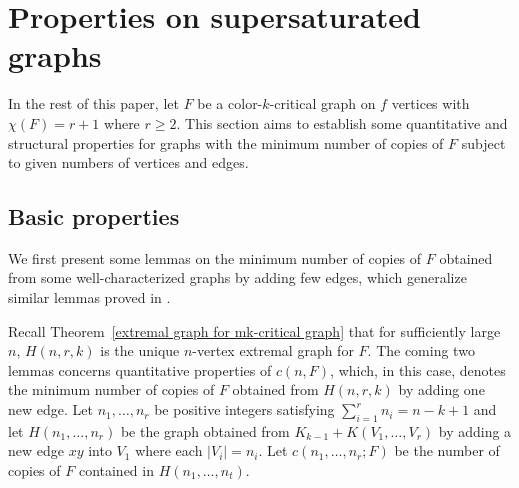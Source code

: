 \documentclass[10pt]{article}
\begin{document}
\section{Properties on supersaturated graphs}\label{sec_properties-of-H}
In the rest of this paper, let $F$ be a color-$k$-critical graph on $f$ vertices with $\chi(F)=r+1$ where $r\geq 2$.
This section aims to establish some quantitative and structural properties for graphs with the minimum number of copies of $F$ subject to given numbers of vertices and edges.

\subsection{Basic properties}
We first present some lemmas on the minimum number of copies of $F$ obtained from some well-characterized graphs by adding few edges,
which generalize similar lemmas proved in \cite{mubayi2010, pikhurko2017}.

Recall Theorem~\ref{extremal graph for mk-critical graph} that for sufficiently large $n$,
$H(n,r,k)$ is the unique $n$-vertex extremal graph for $F$.
The coming two lemmas concerns quantitative properties of $c(n,F)$,
which, in this case, denotes the minimum number of copies of $F$ obtained from $H(n,r,k)$ by adding one new edge.
Let $n_1,\ldots, n_r$ be positive integers satisfying $\sum_{i=1}^r n_i=n-k+1$ and
let $H(n_1,\ldots, n_r)$ be the graph obtained from $K_{k-1}+K(V_1,\ldots,V_r)$ by adding a new edge $xy$ into $V_1$ where each $|V_i|=n_i$.
Let $c(n_1,\ldots,n_r;F)$ be the number of copies of $F$ contained in $H(n_1,\ldots, n_t)$.
\end{document}
